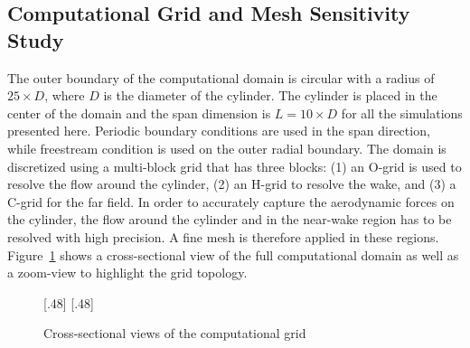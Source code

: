 \subsection{Computational Grid and Mesh Sensitivity Study}
\label{sec:grids}
%
The outer boundary of the computational domain is circular with a radius of
$25\times D$, where $D$ is the diameter of the cylinder. The cylinder is placed
in the center of the domain and the span dimension is $L=10\times D$ for all
the simulations presented here. Periodic boundary conditions are used in the
span direction, while freestream condition is used on the outer radial
boundary. The domain is discretized using a multi-block grid that has three
blocks: (1) an O-grid is used to resolve the flow around the cylinder, (2) an
H-grid to resolve the wake, and (3) a C-grid for the far field. In order to
accurately capture the aerodynamic forces on the cylinder, the flow around the
cylinder and in the near-wake region has to be resolved with high precision. A
fine mesh is therefore applied in these regions. Figure~\ref{fig:Mesh} shows a
cross-sectional view of the full computational domain as well as a zoom-view to
highlight the grid topology.
%
\begin{figure}[htb!]
  \centering
    [.48\linewidth]{}
  \hspace*{\fill}
    [.48\linewidth]{}
  \caption{Cross-sectional views of the computational grid}
  \label{fig:Mesh}
\end{figure}

